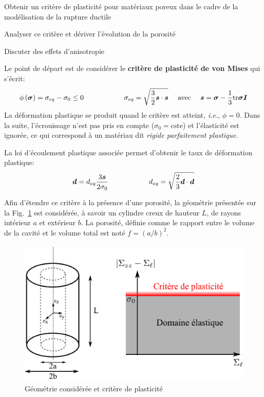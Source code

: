 \documentclass[french,english,12pt]{exam}
\begin{document}
\thispagestyle{empty}

\begin{objectifs}
\item Obtenir un critère de plasticité pour matériaux poreux dans le cadre de la modélisation de la rupture ductile
\item Analyser ce critère et dériver l'évolution de la porosité
\item Discuter des effets d'anisotropie
\end{objectifs}

Le point de départ est de considérer le \textbf{critère de plasticité de von Mises} qui s'écrit:
\begin{equation}
  \phi\left( \boldsymbol{\sigma}   \right) =  \sigma_{eq} - \sigma_0 \leq 0 \hspace{2cm} \sigma_{eq} = \sqrt{\frac{3}{2} \boldsymbol{s} \cdot \boldsymbol{s}} \ \ \ \ \mathrm{avec} \ \ \ \ \boldsymbol{s} = \boldsymbol{\sigma} - \frac{1}{3} \mathrm{tr}\boldsymbol{\sigma} \boldsymbol{I}
  \label{eq1}
\end{equation}
La déformation plastique se produit quand le critère est atteint, \textit{i.e.}, $\phi = 0$. Dans la suite, l'écrouissage n'est pas pris en compte ($\sigma_0 = \text{cste}$) et l'élasticité est ignorée, ce qui correspond à un matériau dit \textit{rigide parfaitement plastique}.

La loi d'écoulement plastique associée permet d'obtenir le taux de déformation plastique:
\begin{equation}
  \boldsymbol{d} = d_{eq} \frac{3 \boldsymbol{s}}{2 \sigma_0}  \hspace{2cm} d_{eq} = \sqrt{\frac{2}{3}\boldsymbol{d} \cdot \boldsymbol{d} }
  \label{eq200}
\end{equation}

Afin d'étendre ce critère à la présence d'une porosité, la géométrie présentée sur la Fig.~\ref{fig1} est considérée, à savoir un cylindre creux de hauteur $L$, de rayons intérieur $a$ et extérieur $b$. La porosité, définie comme le rapport entre le volume de la cavité et le volume total est noté $f = (a/b)^2$.
\begin{figure}[H]
  \centering
  \includegraphics[height = 7cm]{homoMEALOR.pdf}
\caption{Géométrie considérée et critère de plasticité}
\label{fig1}
\end{figure}
\end{document}
